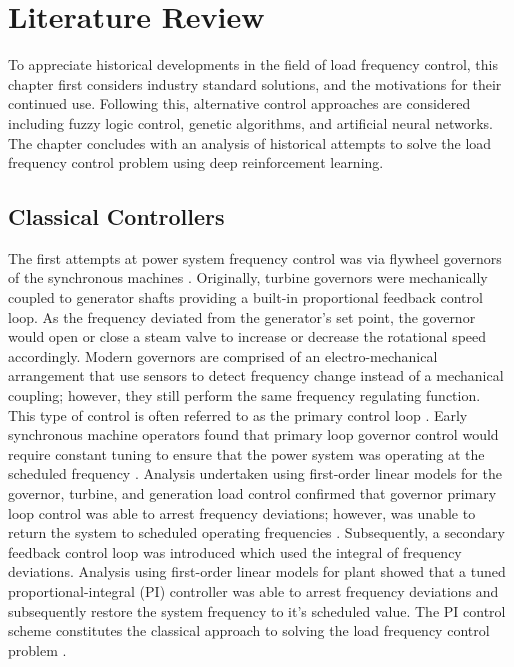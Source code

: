 \chapter{Literature Review}
To appreciate historical developments in the field of load frequency control, this chapter first considers industry standard solutions, and the motivations for their continued use. Following this, alternative control approaches are considered including fuzzy logic control, genetic algorithms, and artificial neural networks. The chapter concludes with an analysis of historical attempts to solve the load frequency control problem using deep reinforcement learning.

\section{Classical Controllers}\label{agc}
The first attempts at power system frequency control was via flywheel governors of the synchronous machines \cite{Prabhat2005}. Originally, turbine governors were mechanically coupled to generator shafts providing a built-in proportional feedback control loop. As the frequency deviated from the generator's set point, the governor would open or close a steam valve to increase or decrease the rotational speed accordingly. Modern governors are comprised of an electro-mechanical arrangement that use sensors to detect frequency change instead of a mechanical coupling; however, they still perform the same frequency regulating function. This type of control is often referred to as the primary control loop \cite{Bevrani2011}. Early synchronous machine operators found that primary loop governor control would require constant tuning to ensure that the power system was operating at the scheduled frequency \cite{Cohn1983}. Analysis undertaken using first-order linear models for the governor, turbine, and generation load control confirmed that governor primary loop control was able to arrest frequency deviations; however, was unable to return the system to scheduled operating frequencies \cite{Saadat2011}. Subsequently, a secondary feedback control loop was introduced which used the integral of frequency deviations. Analysis using first-order linear models for plant showed that a tuned proportional-integral (PI) controller was able to arrest frequency deviations and subsequently restore the system frequency to it's scheduled value. The PI control scheme constitutes the classical approach to solving the load frequency control problem \cite{Prabhat2005}.

